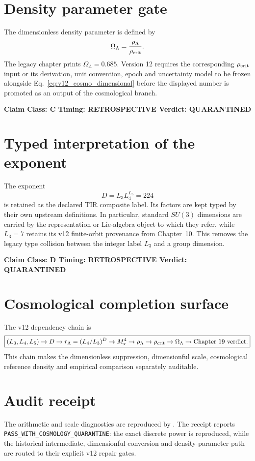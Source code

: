 \documentclass[11pt,a4paper,twoside]{book}
\theoremstyle{definition}
\newcommand{\vTwelveStatus}[3]{\par\noindent\textbf{Claim Class: #1 \quad Timing: #2 \quad Verdict: #3}\par}
\begin{document}
\section{Density parameter gate}

The dimensionless density parameter is defined by
\begin{equation}
\Omega_\Lambda=\frac{\rho_\Lambda}{\rho_{\rm crit}}.
\label{eq:v12_omega_lambda}
\end{equation}
The legacy chapter prints $\Omega_\Lambda=0.685$. Version 12 requires the corresponding $\rho_{\rm crit}$ input or its derivation, unit convention, epoch and uncertainty model to be frozen alongside Eq.~\eqref{eq:v12_cosmo_dimensional} before the displayed number is promoted as an output of the cosmological branch.
\vTwelveStatus{C}{RETROSPECTIVE}{QUARANTINED}

\section{Typed interpretation of the exponent}

The exponent
\begin{equation}
D=L_3L_4^{L_5}=224
\end{equation}
is retained as the declared TIR composite label. Its factors are kept typed by their own upstream definitions. In particular, standard $SU(3)$ dimensions are carried by the representation or Lie-algebra object to which they refer, while $L_3=7$ retains its v12 finite-orbit provenance from Chapter~10. This removes the legacy type collision between the integer label $L_3$ and a group dimension.
\vTwelveStatus{D}{RETROSPECTIVE}{QUARANTINED}

\section{Cosmological completion surface}

The v12 dependency chain is
\[
\boxed{
(L_3,L_4,L_5)
\to D
\to r_\Lambda=(L_4/L_3)^D
\to M_\star^4
\to\rho_\Lambda
\to\rho_{\rm crit}
\to\Omega_\Lambda
\to\text{Chapter 19 verdict}.
}
\]
This chain makes the dimensionless suppression, dimensionful scale, cosmological reference density and empirical comparison separately auditable.

\section{Audit receipt}

The arithmetic and scale diagnostics are reproduced by
.
The receipt
reports \texttt{PASS\_WITH\_COSMOLOGY\_QUARANTINE}: the exact discrete power is reproduced, while the historical intermediate, dimensionful conversion and density-parameter path are routed to their explicit v12 repair gates.
\end{document}
